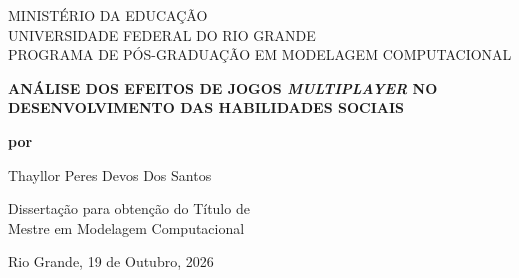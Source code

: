 
\thispagestyle{empty}

\begin{center}
\vspace*{1cm}

MINISTÉRIO DA EDUCAÇÃO\\
UNIVERSIDADE FEDERAL DO RIO GRANDE\\
PROGRAMA DE PÓS-GRADUAÇÃO EM MODELAGEM COMPUTACIONAL\\

\vspace{3cm}

{\textbf{ANÁLISE DOS EFEITOS DE JOGOS \textit{MULTIPLAYER} NO DESENVOLVIMENTO DAS HABILIDADES SOCIAIS}}

\vspace{2cm}

\textbf{por}

\vspace{2cm}

{Thayllor Peres Devos Dos Santos}

\vspace{2cm}

{Dissertação para obtenção do Título de \\
Mestre em Modelagem Computacional}

\vfill

Rio Grande, 19 de Outubro, 2026

\vspace{0.5cm}


\end{center}

